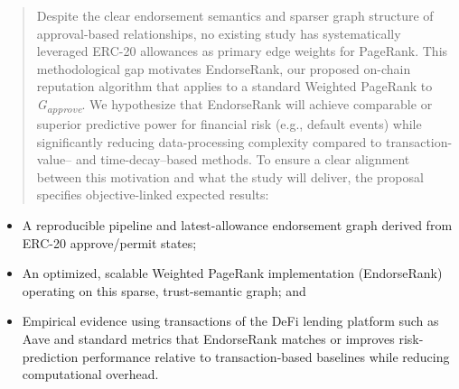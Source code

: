 \documentclass[
]{article}
\begin{document}
\begin{quote}
Despite the clear endorsement semantics and sparser graph structure of approval-based relationships, no existing study has systematically leveraged ERC-20 allowances as primary edge weights for PageRank. This methodological gap motivates EndorseRank, our proposed on-chain reputation algorithm that applies to a standard Weighted PageRank to \emph{G\textsubscript{approve}}. We hypothesize that EndorseRank will achieve comparable or superior predictive power for financial risk (e.g., default events) while significantly reducing data-processing complexity compared to transaction- value-- and time-decay--based methods. To ensure a clear alignment between this motivation and what the study will deliver, the proposal specifies objective-linked expected results:
\end{quote}

\begin{itemize}
\item
  A reproducible pipeline and latest-allowance endorsement graph derived from ERC-20 approve/permit states;
\item
  An optimized, scalable Weighted PageRank implementation (EndorseRank) operating on this sparse, trust-semantic graph; and
\item
  Empirical evidence using transactions of the DeFi lending platform such as Aave and standard metrics that EndorseRank matches or improves risk-prediction performance relative to transaction-based baselines while reducing computational overhead.
\end{itemize}
\end{document}

